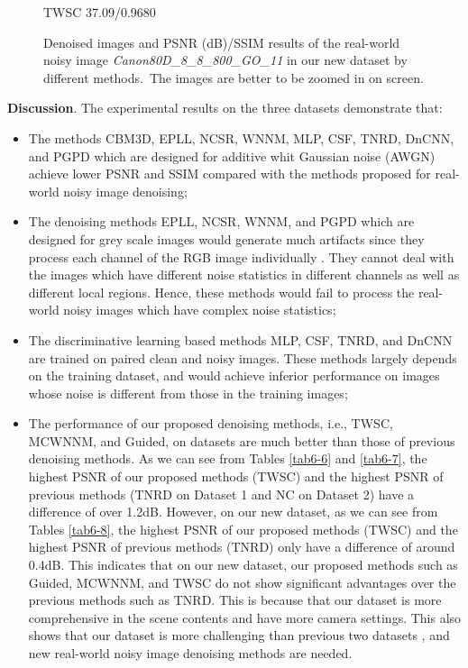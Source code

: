\begin{figure}
{\begin{minipage}[t]{0.24\textwidth}
{\footnotesize TWSC 37.09/0.9680}
\end{minipage}
}\vspace{-3mm}
\caption{Denoised images and PSNR (dB)/SSIM results of the real-world noisy image \textsl{Canon80D\_8\_8\_800\_GO\_11} in our new dataset by different methods.\ The images are better to be zoomed in on screen.}
    \label{fig6-7}
\end{figure}


\textbf{Discussion}. 
The experimental results on the three datasets demonstrate that:
\begin{itemize}
\item The methods CBM3D, EPLL, NCSR, WNNM, MLP, CSF, TNRD, DnCNN, and PGPD which are designed for additive whit Gaussian noise (AWGN) achieve lower PSNR and SSIM compared with the methods proposed for real-world noisy image denoising;

\item The denoising methods EPLL, NCSR, WNNM, and PGPD which are designed for grey scale images would generate much artifacts since they process each channel of the RGB image individually \cite{srcolor}. They cannot deal with the images which have different noise statistics in different channels as well as different local regions. Hence, these methods would fail to process the real-world noisy images which have complex noise statistics;

\item The discriminative learning based methods MLP, CSF, TNRD, and DnCNN are trained on paired clean and noisy images. These methods largely depends on the training dataset, and would achieve inferior performance on images whose noise is different from those in the training images;

\item The performance of our proposed denoising methods, i.e., TWSC, MCWNNM, and Guided, on datasets \cite{crosschannel2016,dnd2017} are much better than those of previous denoising methods. As we can see from Tables \ref{tab6-6} and \ref{tab6-7}, the highest PSNR of our proposed methods (TWSC) and the highest PSNR of previous methods (TNRD on Dataset 1 and NC on Dataset 2) have a difference of over 1.2dB. However, on our new dataset, as we can see from Tables \ref{tab6-8}, the highest PSNR of our proposed methods (TWSC) and the highest PSNR of previous methods (TNRD) only have a difference of around 0.4dB. This indicates that on our new dataset, our proposed methods such as Guided, MCWNNM, and TWSC do not show significant advantages over the previous methods such as TNRD. This is because that our dataset is more comprehensive in the scene contents and have more camera settings. This also shows that our dataset is more challenging than previous two datasets \cite{crosschannel2016,dnd2017}, and new real-world noisy image denoising methods are needed.
  
\end{itemize}



